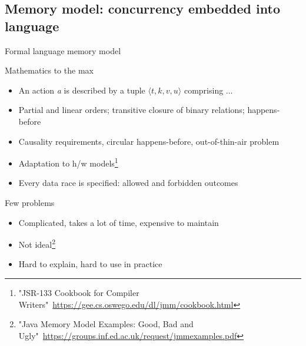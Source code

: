 \subsection{Memory model: concurrency embedded into language}
\showTOCSub

\begin{frame}{Formal language memory model}

Mathematics to the max
\begin{itemize}
  \pause \item An action \textit{a} is described by a tuple $\langle t, k, v, u\rangle$ comprising ...\
  \pause \item Partial and linear orders; transitive closure of binary relations; happens-before
  \pause \item Causality requirements, circular happens-before, out-of-thin-air problem
  \pause \item Adaptation to h/w models\footnote<5->{\tiny"JSR-133 Cookbook for Compiler Writers"\ \url{https://gee.cs.oswego.edu/dl/jmm/cookbook.html}}
  \pause \item Every data race is specified: allowed and forbidden outcomes
\end{itemize}

\pause
Few problems
\begin{itemize}
  \item Complicated, takes a lot of time, expensive to maintain
  \item Not ideal\footnote<7->{\tiny"Java Memory Model Examples: Good, Bad and Ugly"\ \url{https://groups.inf.ed.ac.uk/request/jmmexamples.pdf}}
  \item Hard to explain, hard to use in practice
\end{itemize}
\end{frame}


